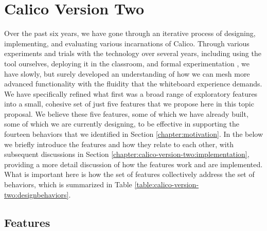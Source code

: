 \chapter{Calico Version Two}
\label{chapter:calico-version-two}

Over the past six years, we have gone through an iterative process of designing, implementing, and evaluating various incarnations of Calico. Through various experiments and trials with the technology over several years, including using the tool ourselves, deploying it in the classroom, and formal experimentation \cite{mangano2012design}, we have slowly, but surely developed an understanding of how we can mesh more advanced functionality with the fluidity that the whiteboard experience demands. We have specifically refined what first was a broad range of exploratory features into a small, cohesive set of just five features that we propose here in this topic proposal. We believe these five features, some of which we have already built, some of which we are currently designing, to be effective in supporting the fourteen behaviors that we identified in Section \ref{chapter:motivation}. In the below we briefly introduce the features and how they relate to each other, with subsequent discussions in Section \ref{chapter:calico-version-two:implementation}, providing a more detail discussion of how the features work and are implemented. What is important here is how the set of features collectively address the set of behaviors, which is summarized in Table \ref{table:calico-version-two:designbehaviors}. 

\section{Features}
\label{chapter:calico-version-two:features}

